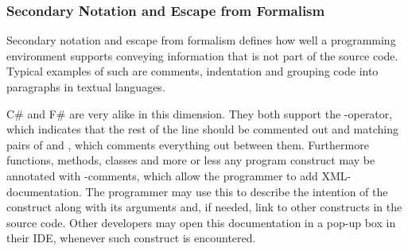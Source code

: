 \subsubsection{Secondary Notation and Escape from Formalism}
Secondary notation and escape from formalism defines how well a programming environment supports conveying information that is not part of the source code. Typical examples of such are comments, indentation and grouping code into paragraphs in textual languages\cite{green1996usability}.

C\# and F\# are very alike in this dimension. They both support the \ttt{//}-operator, which indicates that the rest of the line should be commented out and matching pairs of \ttt{/*} and \ttt{*/}, which comments everything out between them. Furthermore functions, methods, classes and more or less any program construct may be annotated with \ttt{///}-comments, which allow the programmer to add \gls{XML}-documentation\cite{fsharp:xml:doc}. The programmer may use this to describe the intention of the construct along with its arguments and, if needed, link to other constructs in the source code. Other developers may open this documentation in a pop-up box in their \gls{IDE}, whenever such construct is encountered.
